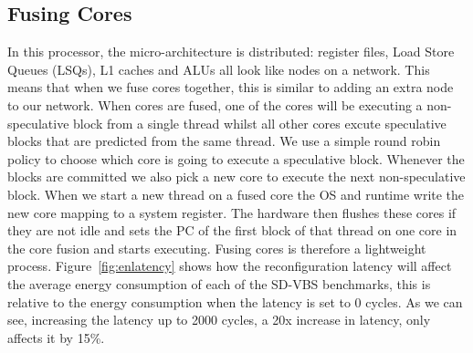 \subsection{Fusing Cores}
In this processor, the micro-architecture is distributed: register files, Load Store Queues (LSQs), L1 caches and ALUs all look like nodes on a network.
This means that when we fuse cores together, this is similar to adding an extra node to our network.
When cores are fused, one of the cores will be executing a non-speculative block from a single thread whilst all other cores excute speculative blocks that are predicted from the same thread.
We use a simple round robin policy to choose which core is going to execute a speculative block.
Whenever the blocks are committed we also pick a new core to execute the next non-speculative block.
When we start a new thread on a fused core the OS and runtime write the new core mapping to a system register.
The hardware then flushes these cores if they are not idle and sets the PC of the first block of that thread on one core in the core fusion and starts executing.
Fusing cores is therefore a lightweight process.
Figure~\ref{fig:enlatency} shows how the reconfiguration latency will affect the average energy consumption of each of the SD-VBS benchmarks, this is relative to the energy consumption when the latency is set to 0 cycles.
As we can see, increasing the latency up to 2000 cycles, a 20x increase in latency, only affects it by 15\%.
%
%
%

